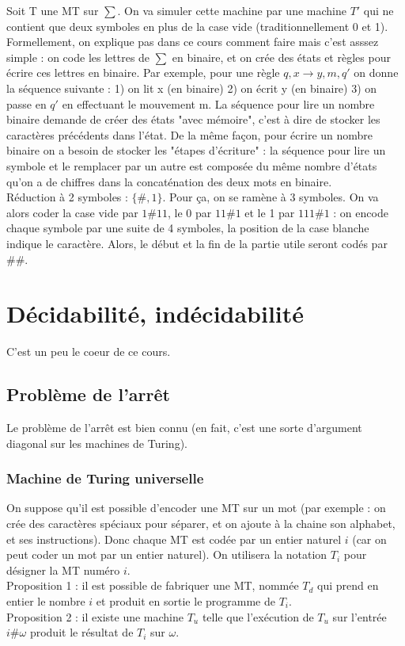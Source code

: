 \documentclass{article}
\begin{document}
Soit T une MT sur $\sum$. On va simuler cette machine par une machine $T'$ qui ne contient que deux symboles en plus de la case vide (traditionnellement 0 et 1). Formellement, on explique pas dans ce cours comment faire mais c'est asssez simple : on code les lettres de $\sum$ en binaire, et on crée des états et règles pour écrire ces lettres en binaire. Par exemple, pour une règle $q,x \rightarrow y, m, q'$ on donne la séquence suivante : 1) on lit x (en binaire) 2) on écrit y (en binaire) 3) on passe en $q'$ en effectuant le mouvement m.  La séquence pour lire un nombre binaire demande de créer des états "avec mémoire", c'est à dire de stocker les caractères précédents dans l'état. De la même façon, pour écrire un nombre binaire on a besoin de stocker les "étapes d'écriture" : la séquence pour lire un symbole et le remplacer par un autre est composée du même nombre d'états qu'on a de chiffres dans la concaténation des deux mots en binaire. \\
Réduction à 2 symboles : $\{ \#, 1 \}$. Pour ça, on se ramène à 3 symboles. On va alors coder la case vide par $1\#11$, le 0 par $11\#1$ et le 1 par $111\#1$ : on encode chaque symbole par une suite de 4 symboles, la position de la case blanche indique le caractère. Alors, le début et la fin de la partie utile seront codés par $\#\#$.

\section{Décidabilité, indécidabilité}  

C'est un peu le coeur de ce cours. 

\subsection{Problème de l'arrêt}

Le problème de l'arrêt est bien connu (en fait, c'est une sorte d'argument diagonal sur les machines de Turing). 

\subsubsection{Machine de Turing universelle}

On suppose qu'il est possible d'encoder une MT sur un mot (par exemple : on crée des caractères spéciaux pour séparer, et on ajoute à la chaine son alphabet, et ses instructions). Donc chaque MT est codée par un entier naturel $i$ (car on peut coder un mot par un entier naturel). On utilisera la notation $T_i$ pour désigner la MT numéro $i$. \\ 
Proposition 1 : il est possible de fabriquer une MT, nommée $T_d$ qui prend en entier le nombre $i$ et produit en sortie le programme de $T_i$. \\ 
Proposition 2 : il existe une machine $T_u$ telle que l'exécution de $T_u$ sur l'entrée $i\# \omega$ produit le résultat de $T_i$ sur $\omega$. \\ 
\end{document}
